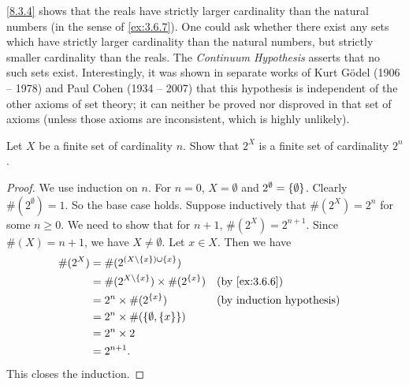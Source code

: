 \setcounter{thm}{5}
\begin{rmk}\label{8.3.6}
  \cref{8.3.4} shows that the reals have strictly larger cardinality than the natural numbers (in the sense of \cref{ex:3.6.7}).
  One could ask whether there exist any sets which have strictly larger cardinality than the natural numbers, but strictly smaller cardinality than the reals.
  The \emph{Continuum Hypothesis} asserts that no such sets exist.
  Interestingly, it was shown in separate works of Kurt Gödel (1906 -- 1978) and Paul Cohen (1934 -- 2007) that this hypothesis is independent of the other axioms of set theory;
  it can neither be proved nor disproved in that set of axioms
  (unless those axioms are inconsistent, which is highly unlikely).
\end{rmk}

\exercisesection

\begin{ex}\label{ex:8.3.1}
  Let \(X\) be a finite set of cardinality \(n\).
  Show that \(2^X\) is a finite set of cardinality \(2^n\).
\end{ex}

\begin{proof}
  We use induction on \(n\).
  For \(n = 0\), \(X = \emptyset\) and \(2^{\emptyset} = \left\lbrace\emptyset\right\rbrace\).
  Clearly \(\#(2^{\emptyset}) = 1\).
  So the base case holds.
  Suppose inductively that \(\#(2^X) = 2^n\) for some \(n \geq 0\).
  We need to show that for \(n + 1\), \(\#(2^X) = 2^{n + 1}\).
  Since \(\#(X) = n + 1\), we have \(X \neq \emptyset\).
  Let \(x \in X\).
  Then we have
  \begin{align*}
    \#(2^X) & = \#(2^{(X \setminus \set{x}) \cup \set{x}})                            \\
            & = \#(2^{X \setminus \set{x}}) \times \#(2^{\set{x}}) &  & \by{ex:3.6.6} \\
            & = 2^n \times \#(2^{\set{x}})                         &  & \byIH         \\
            & = 2^n \times \#(\set{\emptyset, \set{x}})                               \\
            & = 2^n \times 2                                                          \\
            & = 2^{n + 1}.
  \end{align*}
  This closes the induction.
\end{proof}

